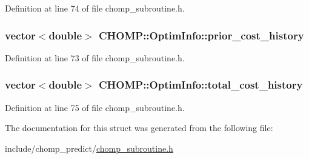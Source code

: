 Definition at line 74 of file chomp\+\_\+subroutine.\+h.

\subsubsection[{\texorpdfstring{prior\+\_\+cost\+\_\+history}{prior_cost_history}}]{\setlength{\rightskip}{0pt plus 5cm}vector$<$double$>$ C\+H\+O\+M\+P\+::\+Optim\+Info\+::prior\+\_\+cost\+\_\+history}\hypertarget{struct_c_h_o_m_p_1_1_optim_info_af3837487472aa772f6aeace2c32f356a}{}\label{struct_c_h_o_m_p_1_1_optim_info_af3837487472aa772f6aeace2c32f356a}


Definition at line 73 of file chomp\+\_\+subroutine.\+h.

\subsubsection[{\texorpdfstring{total\+\_\+cost\+\_\+history}{total_cost_history}}]{\setlength{\rightskip}{0pt plus 5cm}vector$<$double$>$ C\+H\+O\+M\+P\+::\+Optim\+Info\+::total\+\_\+cost\+\_\+history}\hypertarget{struct_c_h_o_m_p_1_1_optim_info_a47f69044821c9ff79aabd1acb5424926}{}\label{struct_c_h_o_m_p_1_1_optim_info_a47f69044821c9ff79aabd1acb5424926}


Definition at line 75 of file chomp\+\_\+subroutine.\+h.



The documentation for this struct was generated from the following file\+:\begin{DoxyCompactItemize}
\item 
include/chomp\+\_\+predict/\hyperlink{chomp__subroutine_8h}{chomp\+\_\+subroutine.\+h}\end{DoxyCompactItemize}
